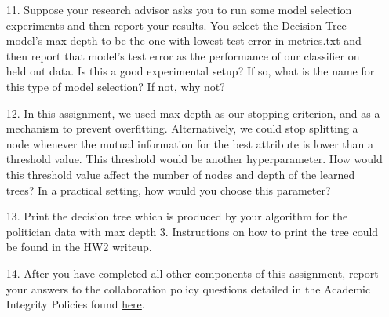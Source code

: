\begin{enumerate}
    \item[11.] Suppose your research advisor asks you to run some model selection experiments and then report your results. You select the Decision Tree model's max-depth to be the one with lowest test error in metrics.txt and then report that model's test error as the performance of our classifier on held out data. Is this a good experimental setup? If so, what is the name for this type of model selection? If not, why not?
    
    \begin{tcolorbox}[fit,height=2cm,blank, borderline={1pt}{-2pt},nobeforeafter]
    \end{tcolorbox}
    
    
    \item[12.] In this assignment, we used max-depth as our stopping criterion, and as a mechanism to prevent overfitting. Alternatively, we could stop splitting a node whenever the mutual information for the best attribute is lower than a threshold value. This threshold would be another hyperparameter. How would this threshold value affect the number of nodes and depth of the learned trees? In a practical setting, how would you choose this parameter? 
    
    \begin{tcolorbox}[fit,height=2cm,blank, borderline={1pt}{-2pt},nobeforeafter]
    \end{tcolorbox}
    
    \item[13.] Print the decision tree which is produced by your algorithm for the politician data with max depth 3. Instructions on how to print the tree could be found in the HW2 writeup.

    \begin{tcolorbox}[fit,height=5cm,blank, borderline={1pt}{-2pt},nobeforeafter]
    \end{tcolorbox}

    \item[14.] After you have completed all other components of this assignment, report your answers to the collaboration policy questions detailed in the Academic Integrity Policies found \href{http://www.cs.cmu.edu/~mgormley/courses/10601-s18/about.html#7-academic-integrity-policies}{here}.
    

\end{enumerate}
